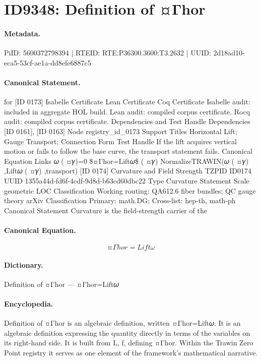 \section*{ID9348: Definition of ¤Γhor}
\paragraph{Metadata.}
PiID: 5600372798394 | RTEID: RTE:P36300.3600:T3.2632 | UUID: 2d18ad10-eca5-53cf-ae1a-dd8efe6887c5

\paragraph{Canonical Statement.}
for [ID 0173] Isabelle Certificate Lean Certificate Coq Certificate Isabelle audit: included in aggregate HOL build. Lean audit: compiled corpus certificate. Rocq audit: compiled corpus certificate. Dependencies and Test Handle Dependencies [ID 0161], [ID 0163] Node registry\_id\_0173 Support Titles Horizontal Lift; Gauge Transport; Connection Form Test Handle If the lift acquires vertical motion or fails to follow the base curve, the transport statement fails. Canonical Equation Links 𝜔 ( ¤𝛾)=0 \$¤Γhor=Lift𝜔\$ ( ¤𝛾) NormalizeTRAWIN(𝜔 ( ¤𝛾) ,Lift𝜔 ( ¤𝛾) ,transport) [ID 0174] Curvature and Field Strength TZPID ID0174 UUID 1355a44d-fd6f-4cdf-9d8d-b63cd60dbc22 Type Curvature Statement Scale geometric LOC Classification Working routing: QA612.6 fiber bundles; QC gauge theory arXiv Classification Primary: math.DG; Cross-list: hep-th, math-ph Canonical Statement Curvature is the field-strength carrier of the

\paragraph{Canonical Equation.}
\[
¤Γhor=Lift𝜔
\]

\paragraph{Dictionary.}
Definition of ¤Γhor — ¤Γhor=Lift𝜔

\paragraph{Encyclopedia.}
Definition of ¤Γhor is an algebraic definition, written ¤Γhor=Lift𝜔. It is an algebraic definition expressing the quantity directly in terms of the variables on its right-hand side. It is built from L, f, defining ¤Γhor. Within the Trawin Zero Point registry it serves as one element of the framework's mathematical narrative.
